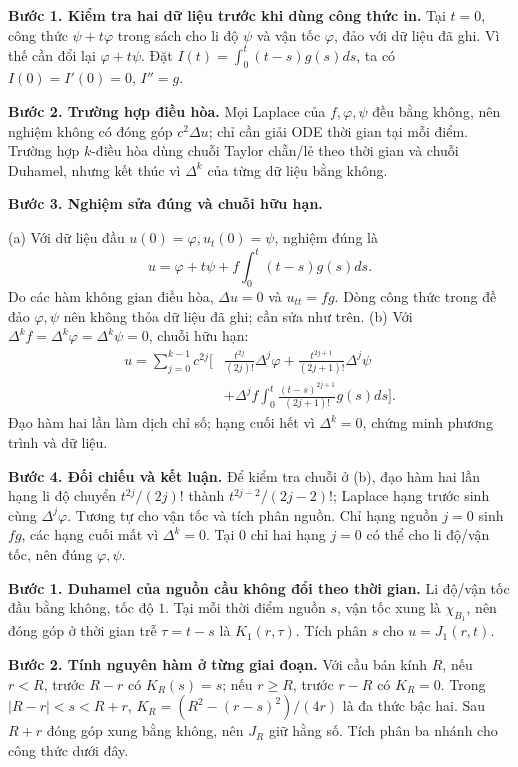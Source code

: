 \textbf{Bước 1. Kiểm tra hai dữ liệu trước khi dùng công thức in.} Tại $t=0$, công thức $\psi+t\varphi$ trong sách cho li độ $\psi$ và vận tốc $\varphi$, đảo với dữ liệu đã ghi. Vì thế cần đổi lại $\varphi+t\psi$. Đặt $I(t)=\int_0^t(t-s)g(s)ds$, ta có $I(0)=I'(0)=0$, $I''=g$.

\textbf{Bước 2. Trường hợp điều hòa.} Mọi Laplace của $f,\varphi,\psi$ đều bằng không, nên nghiệm không có đóng góp $c^2\Delta u$; chỉ cần giải ODE thời gian tại mỗi điểm. Trường hợp $k$-điều hòa dùng chuỗi Taylor chẵn/lẻ theo thời gian và chuỗi Duhamel, nhưng kết thúc vì $\Delta^k$ của từng dữ liệu bằng không.

\textbf{Bước 3. Nghiệm sửa đúng và chuỗi hữu hạn.}

(a) Với dữ liệu đầu $u(0)=\varphi,u_t(0)=\psi$, nghiệm đúng là
\[u=\varphi+t\psi+f\int_0^t(t-s)g(s)ds.\]
Do các hàm không gian điều hòa, $\Delta u=0$ và $u_{tt}=fg$. Dòng công thức trong đề đảo $\varphi,\psi$ nên không thỏa dữ liệu đã ghi; cần sửa như trên.
(b) Với $\Delta^kf=\Delta^k\varphi=\Delta^k\psi=0$, chuỗi hữu hạn:
\begin{align*}
u=\sum_{j=0}^{k-1}c^{2j}\bigg[&\frac{t^{2j}}{(2j)!}\Delta^j\varphi+\frac{t^{2j+1}}{(2j+1)!}\Delta^j\psi\\
&+\Delta^jf\int_0^t\frac{(t-s)^{2j+1}}{(2j+1)!}g(s)ds\bigg].
\end{align*}
Đạo hàm hai lần làm dịch chỉ số; hạng cuối hết vì $\Delta^k=0$, chứng minh phương trình và dữ liệu.

\textbf{Bước 4. Đối chiếu và kết luận.} Để kiểm tra chuỗi ở (b), đạo hàm hai lần hạng li độ chuyển $t^{2j}/(2j)!$ thành $t^{2j-2}/(2j-2)!$; Laplace hạng trước sinh cùng $\Delta^j\varphi$. Tương tự cho vận tốc và tích phân nguồn. Chỉ hạng nguồn $j=0$ sinh $fg$, các hạng cuối mất vì $\Delta^k=0$. Tại $0$ chỉ hai hạng $j=0$ có thể cho li độ/vận tốc, nên đúng $\varphi,\psi$.

\textbf{Bước 1. Duhamel của nguồn cầu không đổi theo thời gian.} Li độ/vận tốc đầu bằng không, tốc độ $1$. Tại mỗi thời điểm nguồn $s$, vận tốc xung là $\chi_{B_1}$, nên đóng góp ở thời gian trễ $\tau=t-s$ là $K_1(r,\tau)$. Tích phân $s$ cho $u=J_1(r,t)$.

\textbf{Bước 2. Tính nguyên hàm ở từng giai đoạn.} Với cầu bán kính $R$, nếu $r<R$, trước $R-r$ có $K_R(s)=s$; nếu $r\ge R$, trước $r-R$ có $K_R=0$. Trong $|R-r|<s<R+r$, $K_R=(R^2-(r-s)^2)/(4r)$ là đa thức bậc hai. Sau $R+r$ đóng góp xung bằng không, nên $J_R$ giữ hằng số. Tích phân ba nhánh cho công thức dưới đây.

